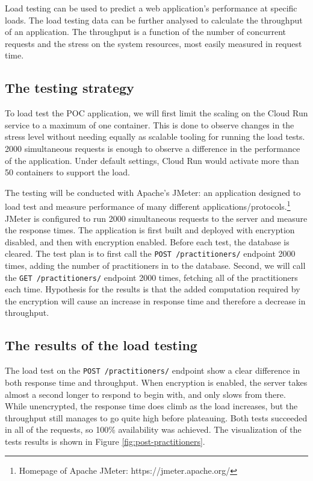 Load testing can be used to predict a web application's performance at specific loads.
The load testing data can be further analysed to calculate the throughput of an application.
The throughput is a function of the number of concurrent requests and the stress on the system resources, most easily measured in request time.
\cite{loadtesting}

\subsection{The testing strategy}

To load test the POC application, we will first limit the scaling on the Cloud Run service to a maximum of one container.
This is done to observe changes in the stress level without needing equally as scalable tooling for running the load tests.
2000 simultaneous requests is enough to observe a difference in the performance of the application.
Under default settings, Cloud Run would activate more than 50 containers to support the load.

The testing will be conducted with Apache's JMeter: an application designed to load test and measure performance of many different applications/protocols.\footnote{Homepage of Apache JMeter: https://jmeter.apache.org/}
JMeter is configured to run 2000 simultaneous requests to the server and measure the response times.
The application is first built and deployed with encryption disabled, and then with encryption enabled.
Before each test, the database is cleared.
The test plan is to first call the \texttt{POST /practitioners/} endpoint 2000 times, adding the number of practitioners in to the database.
Second, we will call the \texttt{GET /practitioners/} endpoint 2000 times, fetching all of the practitioners each time.
Hypothesis for the results is that the added computation required by the encryption will cause an increase in response time and therefore a decrease in throughput.

\subsection{The results of the load testing}

The load test on the \texttt{POST /practitioners/} endpoint show a clear difference in both response time and throughput.
When encryption is enabled, the server takes almost a second longer to respond to begin with, and only slows from there.
While unencrypted, the response time does climb as the load increases, but the throughput still manages to go quite high before plateauing.
Both tests succeeded in all of the requests, so 100\% availability was achieved.
The visualization of the tests results is shown in Figure \ref{fig:post-practitioners}.

